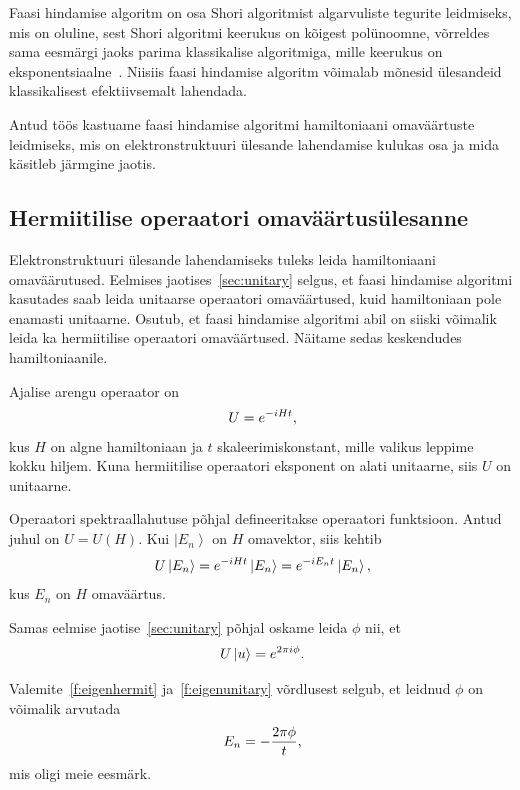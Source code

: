 \documentclass[12pt]{report}
\def\ket#1{\left|#1\right>}
\begin{document}
Faasi hindamise algoritm on osa Shori algoritmist algarvuliste tegurite leidmiseks, mis on oluline, sest Shori algoritmi keerukus on kõigest polünoomne, võrreldes sama eesmärgi jaoks parima klassikalise algoritmiga, mille keerukus on eksponentsiaalne~\cite{cao+etal, kaye+laflamme+mosca}.
Niisiis faasi hindamise algoritm võimalab mõnesid ülesandeid klassikalisest efektiivsemalt lahendada.

Antud töös kastuame faasi hindamise algoritmi hamiltoniaani omaväärtuste leidmiseks, mis on elektronstruktuuri ülesande lahendamise kulukas osa ja mida käsitleb järmgine jaotis.


\subsection{Hermiitilise operaatori omaväärtusülesanne}\label{sec:hermit}

Elektronstruktuuri ülesande lahendamiseks tuleks leida hamiltoniaani omaväärutused.
Eelmises jaotises~\ref{sec:unitary} selgus, et faasi hindamise algoritmi kasutades saab leida unitaarse operaatori omaväärtused, kuid hamiltoniaan pole enamasti unitaarne.
Osutub, et faasi hindamise algoritmi abil on siiski võimalik leida ka hermiitilise operaatori omaväärtused.
Näitame sedas keskendudes hamiltoniaanile.

Ajalise arengu operaator on
\begin{align}
    U = e^{-iHt} \rlap{,}
\end{align}
kus \(H\) on algne hamiltoniaan ja \(t\) skaleerimiskonstant, mille valikus leppime kokku hiljem.
Kuna hermiitilise operaatori eksponent on alati unitaarne, siis \(U\) on unitaarne.

Operaatori spektraallahutuse põhjal defineeritakse operaatori funktsioon.
Antud juhul on \(U=U(H)\).
Kui \(\ket{E_n}\) on \(H\) omavektor, siis kehtib
\begin{align}\label{f:eigenhermit}
    U \ket{E_n} = e^{-iHt}\ket{E_n} = e^{-i E_n t} \ket{E_n} \rlap{,}
\end{align}
kus \(E_n\) on \(H\) omaväärtus.

Samas eelmise jaotise~\ref{sec:unitary} põhjal oskame leida \(\phi\) nii, et
\begin{align}\label{f:eigenunitary}
    U \ket{u} = e^{2\pi i\phi} \rlap{.}
\end{align}

Valemite~\ref{f:eigenhermit} ja~\ref{f:eigenunitary} võrdlusest selgub, et leidnud \(\phi\) on võimalik arvutada
\begin{align}
    E_n = -\frac{2\pi\phi}{t} \rlap{,}
\end{align}
mis oligi meie eesmärk.
\end{document}
